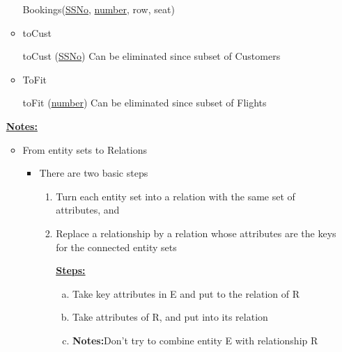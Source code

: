 \documentclass[12pt]{article}
\begin{document}
\begin{enumerate}[1.]
\begin{itemize}
        Bookings(\underline{SSNo}, \underline{number}, row, seat)

        \bigskip

        \item toCust

        \bigskip

        toCust (\underline{SSNo}) \color{red}Can be eliminated since subset of Customers\color{black}

        \bigskip

        \item ToFit

        \bigskip

        toFit (\underline{number}) \color{red}Can be eliminated since subset of Flights\color{black}

        \bigskip
    \end{itemize}

    \bigskip

    \underline{\textbf{Notes:}}

    \bigskip

    \begin{itemize}
        \item From entity sets to Relations
        \begin{itemize}
            \item There are two basic steps

            \begin{enumerate}[1.]
                \item Turn each entity set into a relation with the same set of attributes, and
                \item Replace a relationship by a relation whose attributes are the keys for
                the connected entity sets

                \bigskip

                \underline{\textbf{Steps:}}

                \bigskip

                \begin{enumerate}[a.]
                    \item Take key attributes in E and put to the relation of R
                    \item Take attributes of R, and put into its relation

                    \item \color{red}\textbf{Notes:}Don't try to combine entity E with relationship R\color{black}


\end{enumerate}
\end{enumerate}
\end{itemize}
\end{itemize}
\end{enumerate}
\end{document}
